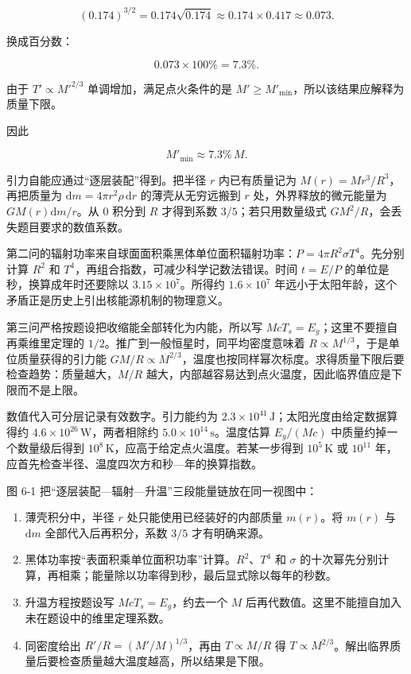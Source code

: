 \documentclass[12pt,a4paper,UTF8]{ctexart}
\newcommand{\tightlist}{\setlength{\itemsep}{0pt}\setlength{\parskip}{0pt}}
\begin{document}
\[\left(0.174\right)^{3/2}
=0.174\sqrt{0.174}
\approx0.174\times0.417
\approx0.073.\]

换成百分数：

\[0.073\times100\%=7.3\%.\]

由于 \(T'\propto M'^{2/3}\) 单调增加，满足点火条件的是
\(M'\geq M'_{\min}\)，所以该结果应解释为质量下限。

因此

\[\boxed{M'_{\min}\approx7.3\%\,M}. \tag{17}\]

引力自能应通过``逐层装配''得到。把半径 \(r\) 内已有质量记为
\(M(r)=M r^3/R^3\)，再把质量为 \(\mathrm dm=4\pi r^2\rho\,\mathrm dr\)
的薄壳从无穷远搬到 \(r\) 处，外界释放的微元能量为
\(G M(r)\mathrm dm/r\)。从 \(0\) 积分到 \(R\) 才得到系数
\(3/5\)；若只用数量级式 \(GM^2/R\)，会丢失题目要求的数值系数。

第二问的辐射功率来自球面面积乘黑体单位面积辐射功率：\(P=4\pi R^2\sigma T^4\)。先分别计算
\(R^2\) 和 \(T^4\)，再组合指数，可减少科学记数法错误。时间 \(t=E/P\)
的单位是秒，换算成年时还要除以 \(3.15\times10^7\)。所得约
\(1.6\times10^7\)
年远小于太阳年龄，这个矛盾正是历史上引出核能源机制的物理意义。

第三问严格按题设把收缩能全部转化为内能，所以写
\(McT_s=E_g\)；这里不要擅自再乘维里定理的
\(1/2\)。推广到一般恒星时，同平均密度意味着
\(R\propto M^{1/3}\)，于是单位质量获得的引力能
\(GM/R\propto M^{2/3}\)，温度也按同样幂次标度。求得质量下限后要检查趋势：质量越大，\(M/R\)
越大，内部越容易达到点火温度，因此临界值应是下限而不是上限。

数值代入可分层记录有效数字。引力能约为
\(2.3\times10^{41}\,\mathrm J\)；太阳光度由给定数据算得约
\(4.6\times10^{26}\,\mathrm W\)，两者相除约
\(5.0\times10^{14}\,\mathrm s\)。温度估算 \(E_g/(Mc)\)
中质量约掉一个数量级后得到
\(10^8\,\mathrm K\)，应高于给定点火温度。若某一步得到
\(10^5\,\mathrm K\) 或 \(10^{11}\)
年，应首先检查半径、温度四次方和秒---年的换算指数。

图 6-1 把``逐层装配---辐射---升温''三段能量链放在同一视图中：

\begin{enumerate}
\def\labelenumi{\arabic{enumi}.}
\tightlist
\item
  薄壳积分中，半径 \(r\) 处只能使用已经装好的内部质量 \(m(r)\)。将
  \(m(r)\) 与 \(\mathrm dm\) 全部代入后再积分，系数 \(3/5\)
  才有明确来源。
\item
  黑体功率按``表面积乘单位面积功率''计算。\(R^2\)、\(T^4\) 和 \(\sigma\)
  的十次幂先分别计算，再相乘；能量除以功率得到秒，最后显式除以每年的秒数。
\item
  升温方程按题设写 \(McT_s=E_g\)，约去一个 \(M\)
  后再代数值。这里不能擅自加入未在题设中的维里定理系数。
\item
  同密度给出 \(R'/R=(M'/M)^{1/3}\)，再由 \(T\propto M/R\) 得
  \(T\propto M^{2/3}\)。解出临界质量后要检查质量越大温度越高，所以结果是下限。
\end{enumerate}
\end{document}
